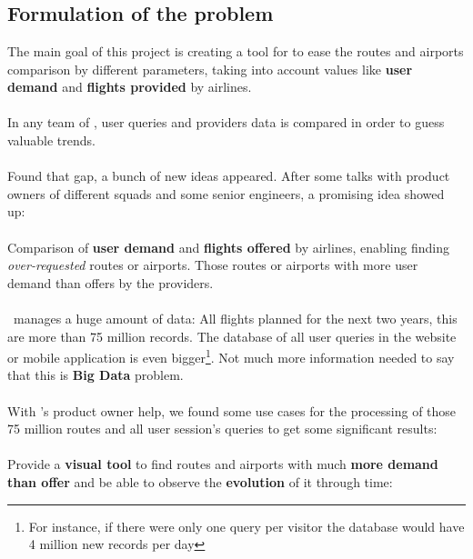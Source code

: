 
\chapter{\thesistitle}

\label{chapter03}


\section{Formulation of the problem} \label{problem}

The main goal of this project is creating a tool for \textit{\company} to ease the routes and airports comparison by different parameters, taking into account values like \textbf{user demand} and \textbf{flights provided} by airlines.
\\\\
In any team of \company, user queries and providers data is compared in order to guess valuable trends.
\\\\
Found that gap, a bunch of new ideas appeared. After some talks with product owners of different squads and some senior engineers, a promising idea showed up:
\\\\
Comparison of \textbf{user demand} and \textbf{flights offered} by airlines, enabling finding \textit{over-requested} routes or airports. Those routes or airports with more user demand than offers by the providers.
\\\\
\squad\ manages a huge amount of data: All flights planned for the next two years, this are more than 75 million records. The database of all user queries in the website or mobile application is even bigger\footnote{For instance, if there were only one query per visitor the database would have 4 million new records per day}. Not much more information needed to say that this is \textbf{Big Data} problem.
\\\\
With \squad's product owner help, we found some use cases for the processing of those 75 million routes and all user session's queries to get some significant results:
\\\\
Provide a \textbf{visual tool} to find routes and airports with much \textbf{more demand than offer} and be able to observe the \textbf{evolution} of it {through time}:


